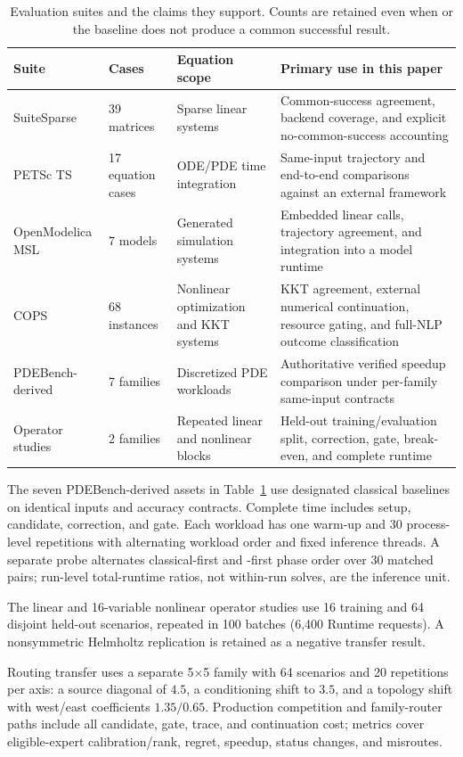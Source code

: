 \begin{table}[t]
\centering
\caption{Evaluation suites and the claims they support. Counts are retained even
when \system or the baseline does not produce a common successful result.}
\label{tab:suites}
\begin{tabular}{p{2.2cm}p{2.0cm}p{3.1cm}p{4.6cm}}
\toprule
Suite & Cases & Equation scope & Primary use in this paper \\
\midrule
SuiteSparse & 39 matrices & Sparse linear systems & Common-success agreement,
backend coverage, and explicit no-common-success accounting \\
PETSc TS & 17 equation cases & ODE/PDE time integration & Same-input trajectory and
end-to-end comparisons against an external framework \\
OpenModelica MSL & 7 models & Generated simulation systems & Embedded linear calls,
trajectory agreement, and integration into a model runtime \\
COPS & 68 instances & Nonlinear optimization and KKT systems & KKT agreement,
external numerical continuation, resource gating, and full-NLP outcome classification \\
PDEBench-derived & 7 families & Discretized PDE workloads & Authoritative verified
speedup comparison under per-family same-input contracts \\
Operator studies & 2 families & Repeated linear and nonlinear blocks & Held-out
training/evaluation split, correction, gate, break-even, and complete runtime \\
\bottomrule
\end{tabular}
\end{table}

The seven PDEBench-derived assets in Table~\ref{tab:suites} use designated classical
baselines on identical inputs and accuracy contracts. Complete time includes setup,
candidate, correction, and gate. Each workload has one warm-up and 30 process-level
repetitions with alternating workload order and fixed inference threads. A separate
probe alternates classical-first and \system-first phase order over 30 matched pairs;
run-level total-runtime ratios, not within-run solves, are the inference unit.

The linear and 16-variable nonlinear operator studies use 16 training and 64
disjoint held-out scenarios, repeated in 100 batches (6,400 Runtime requests).
A nonsymmetric Helmholtz replication is retained as a negative transfer result.

Routing transfer uses a separate 5$\times$5 family with 64 scenarios and 20
repetitions per axis: a source diagonal of $4.5$, a conditioning shift to $3.5$,
and a topology shift with west/east coefficients $1.35/0.65$. Production competition
and family-router paths include all candidate, gate, trace, and continuation cost; metrics
cover eligible-expert calibration/rank, regret, speedup, status changes, and misroutes.

